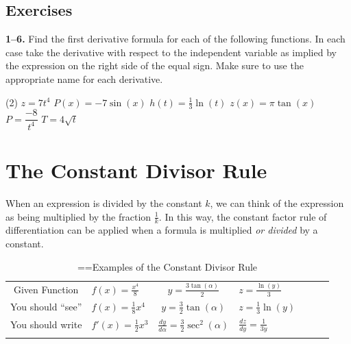 \documentclass[10pt,oneside,]{book}
\theoremstyle{plain}
\theoremstyle{definition}
\numberwithin{equation}{section}
\newcommand{\hrulethin}  {\noalign{\hrule height 0.04em}}
\newcommand{\hrulethick} {\noalign{\hrule height 0.11em}}
\newcommand{\fe}[2]{#1\mathopen{}\left(#2\right)\mathclose{}}
\newcommand{\fd}[1]{#1'}
\newcommand{\lz}[2]{\frac{d#1}{d#2}}
\begin{document}
\subsection[Exercises]{Exercises}\label{exercises-34}
\textbf{1--6. }\hypertarget{exercisegroup-73}{\null}Find the first derivative formula for each of the following functions.  In each case take the derivative with respect to the independent variable as implied by the expression on the right side of the equal sign.  Make sure to use the appropriate name for each derivative.%
\par
\begin{exercisegroup}(2)
\exercise[1.]\hypertarget{exercise-358}{\null}\(z=7t^4\)%
\exercise[2.]\hypertarget{exercise-359}{\null}\(\fe{P}{x}=-7\fe{\sin}{x}\)%
\exercise[3.]\hypertarget{exercise-360}{\null}\(\fe{h}{t}=\frac{1}{3}\fe{\ln}{t}\)%
\exercise[4.]\hypertarget{exercise-361}{\null}\(\fe{z}{x}=\pi\fe{\tan}{x}\)%
\exercise[5.]\hypertarget{exercise-362}{\null}\(P=\dfrac{-8}{t^4}\)%
\exercise[6.]\hypertarget{exercise-363}{\null}\(T=4\sqrt{t}\)%
\end{exercisegroup}
\par\smallskip\noindent
\typeout{************************************************}
\typeout{************************************************}
\section[The Constant Divisor Rule]{The Constant Divisor Rule}\label{section-constant-divisor-rule}
When an expression is divided by the constant \(k\), we can think of the expression as being multiplied by the fraction \(\frac{1}{k}\).  In this way, the constant factor rule of differentiation can be applied when a formula is multiplied \emph{or divided} by a constant.%
\begin{table}
\centering
\caption{\binoppenalty=\maxdimen \relpenalty=\maxdimen Examples of the Constant Divisor Rule\label{table-constant-divisor-rule}}
\begin{tabular}{cAcAcAc}\hrulethick
Given Function&\(\fe{f}{x}=\frac{x^4}{8}\)&\(y=\frac{3\fe{\tan}{\alpha}}{2}\)&\(z=\frac{\fe{\ln}{y}}{3}\)\\\hrulethin
You should ``see''&\(\fe{f}{x}=\frac{1}{8}x^4\)&\(y=\frac{3}{2}\fe{\tan}{\alpha}\)&\(z=\frac{1}{3}\fe{\ln}{y}\)\\\hrulethin
You should write&\(\fe{\fd{f}}{x}=\frac{1}{2}x^3\)&\(\lz{y}{\alpha}=\frac{3}{2}\fe{\sec^2}{\alpha}\)&\(\lz{z}{y}=\frac{1}{3y}\)\\\hrulethick
\end{tabular}
\end{table}
\typeout{************************************************}
\typeout{************************************************}
\end{document}
